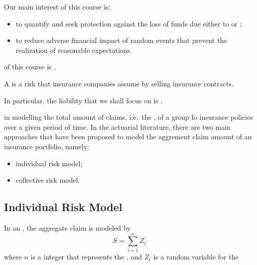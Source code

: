 \documentclass[notoc,notitlepage]{tufte-book}
\begin{document}
Our main interest of this course is:
\begin{itemize}
  \item to quantify and seek protection against the loss of funds due either to  or ;
  \item to reduce adverse financial impact of random events that prevent the realization of reasonable expectations.
\end{itemize}

 of this course is .

\begin{defn}\label{defn:liability_risk}
  A  is a risk that insurance companies assume by selling insurance contracts.
\end{defn}

In particular, the liability that we shall focus on is .

 in modelling the total amount of claims, i.e.\ the , of a group fo insurance policies over a given period of time. In the actuarial literature, there are two main approaches that have been proposed to model the aggrement claim amount of an insurance portfolio, namely:
\begin{itemize}
  \item individual risk model;
  \item collective risk model.
\end{itemize}

\subsection{Individual Risk Model}%
\label{sub:individual_risk_model}

\begin{defn}\label{defn:individual_risk_model}
  In an , the aggregate claim is modeled by
  \begin{equation*}
    S = \sum_{i=1}^{n} Z_i
  \end{equation*}
  where $n$ is a  integer that represents the , and $Z_i$ is a random variable for the 
\end{defn}
\end{document}
